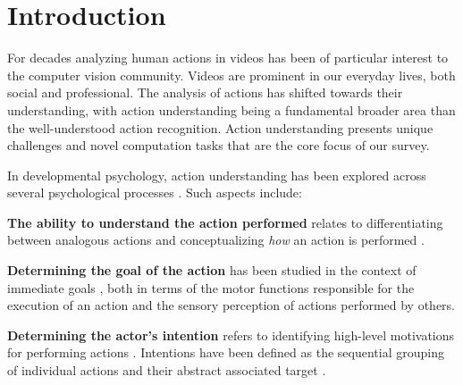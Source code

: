 \section{Introduction}


For decades analyzing human actions in videos has been of particular interest to the computer vision community. Videos are prominent in our everyday lives, both social and professional. The analysis of actions has shifted towards their understanding, with action understanding being a fundamental broader area than the well-understood action recognition. Action understanding presents unique challenges and novel computation tasks that are the core focus of our survey. 

In developmental psychology, action understanding has been explored across several psychological processes \citep{thompson2019conceptualizing}. Such aspects include: 

\noindent
\textbf{The ability to understand the action performed} relates to differentiating between analogous actions \citep{gallese1996action,jeannerod1994representing} and conceptualizing \emph{how} an action is performed \citep{spunt2011identifying}. 

\noindent
\textbf{Determining the goal of the action} has been studied in the context of immediate goals \citep{calvo2005action,kohler2002hearing,rizzolatti2001neurophysiological}, both in terms of the motor functions responsible for the execution of an action and the sensory perception of actions performed by others.

\noindent
\textbf{Determining the actor's intention} refers to identifying high-level motivations for performing actions \citep{kilner2011more}. Intentions have been defined as the sequential grouping of individual actions \citep{fogassi2005parietal} and their abstract associated target \citep{uithol2011understanding}.

